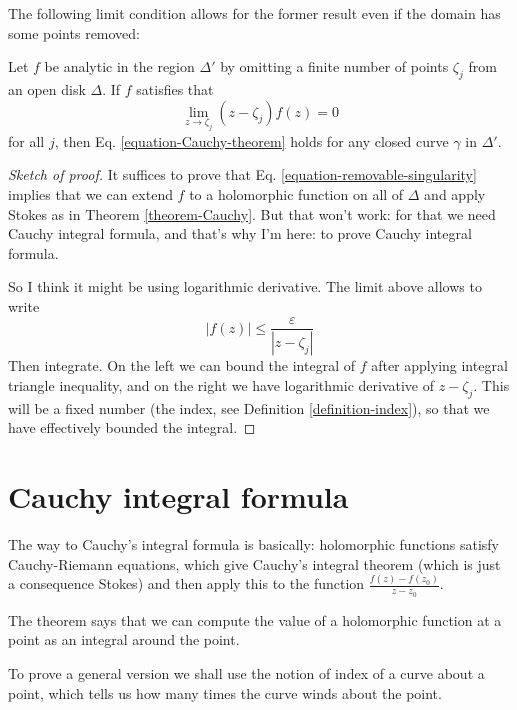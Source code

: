 \noindent
The following limit condition allows for the former result even if the domain
has some points removed:

\begin{theorem}
\label{theorem-Cauchy-removable}
Let $f$ be analytic in the region $\Delta'$ by omitting a finite number of
points $\zeta_j$ from an open disk $\Delta$. If $f$ satisfies that
\begin{equation}
\label{equation-removable-singularity}
\lim_{z\to\zeta_j} (z-\zeta_j)f(z)=0
\end{equation}
for all $j$, then Eq. \ref{equation-Cauchy-theorem} holds for any closed curve
$\gamma$ in $\Delta'$.
\end{theorem}

\begin{proof}[Sketch of proof]
It suffices to prove that Eq. \ref{equation-removable-singularity} implies that
we can extend $f$ to a holomorphic function on all of $\Delta$ and apply Stokes
as in Theorem \ref{theorem-Cauchy}. But that won't work: for that we need Cauchy
integral formula, and that's why I'm here: to prove Cauchy integral formula.

So I think it might be using logarithmic derivative. The limit above allows to
write
$$
|f(z)|\leq \frac{\varepsilon}{|z-\zeta_j|}
$$
Then integrate. On the left we can bound the integral of $f$ after applying
integral triangle inequality, and on the right we have logarithmic derivative of
$z-\zeta_j$. This will be a fixed number (the index, see Definition
\ref{definition-index}), so that we have effectively bounded the integral.
\end{proof}

\section{Cauchy integral formula}
\label{section-Cauchy-integral-formula}

\noindent
The way to Cauchy's integral formula is basically:
holomorphic functions satisfy Cauchy-Riemann equations,
which give Cauchy's integral theorem 
(which is just a consequence Stokes)
and then apply this to the function $\frac{f(z)-f(z_0)}{z-z_0}$.

The theorem says that we can compute the value of
a holomorphic function at a point as an integral around the point.

To prove a general version we shall use the notion of index of a curve
about a point, which tells us how many times the curve winds about the point.

